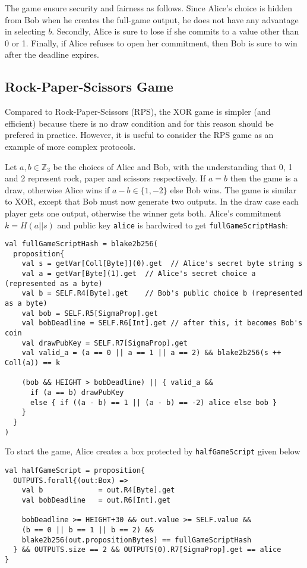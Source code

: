 \documentclass[11pt]{article}
\begin{document}
The game ensure security and fairness as follows. Since Alice's choice is hidden from Bob when he creates the full-game output, he does not have any advantage in selecting $b$. Secondly, Alice is sure to lose if she commits to a value other than 0 or 1. Finally, if Alice refuses to open her commitment, then Bob is sure to win after the deadline expires. 
\subsection{Rock-Paper-Scissors Game}

Compared to Rock-Paper-Scissors (RPS), the XOR game is simpler (and efficient) because there is no draw condition and for this reason should be prefered in practice. However, it is useful to consider the RPS game as an example of more complex protocols.

Let $a, b\in \mathbb{Z}_3$ be the choices of Alice and Bob, with the understanding that 0, 1 and 2 represent rock, paper and scissors respectively. If $a = b$ then the game is a draw, otherwise Alice wins if $a-b \in \{1, -2\}$ else Bob wins. The game is similar to XOR, except that Bob must now generate two outputs. In the draw case each player gets one output, otherwise the winner gets both. 
Alice's commitment $k=H(a||s)$ and public key \texttt{alice} is hardwired to get \texttt{fullGameScriptHash}:

\begin{verbatim}
val fullGameScriptHash = blake2b256(
  proposition{
    val s = getVar[Coll[Byte]](0).get  // Alice's secret byte string s
    val a = getVar[Byte](1).get  // Alice's secret choice a (represented as a byte)
    val b = SELF.R4[Byte].get    // Bob's public choice b (represented as a byte)
    val bob = SELF.R5[SigmaProp].get
    val bobDeadline = SELF.R6[Int].get // after this, it becomes Bob's coin
    val drawPubKey = SELF.R7[SigmaProp].get
    val valid_a = (a == 0 || a == 1 || a == 2) && blake2b256(s ++ Coll(a)) == k

    (bob && HEIGHT > bobDeadline) || { valid_a &&
      if (a == b) drawPubKey
      else { if ((a - b) == 1 || (a - b) == -2) alice else bob }
    }
  }
)
\end{verbatim}

To start the game, Alice creates a box protected by \texttt{halfGameScript} given below

\begin{verbatim}
val halfGameScript = proposition{
  OUTPUTS.forall{(out:Box) =>
    val b             = out.R4[Byte].get
    val bobDeadline   = out.R6[Int].get

    bobDeadline >= HEIGHT+30 && out.value >= SELF.value &&
    (b == 0 || b == 1 || b == 2) && 
    blake2b256(out.propositionBytes) == fullGameScriptHash
  } && OUTPUTS.size == 2 && OUTPUTS(0).R7[SigmaProp].get == alice 
}
\end{verbatim}
\end{document}

